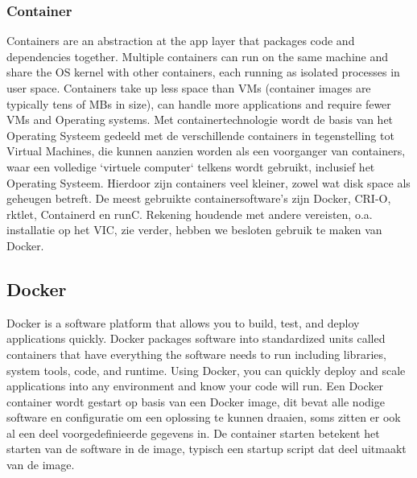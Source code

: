 \subsubsection{Container}
Containers are an abstraction at the app layer that packages code and dependencies together. Multiple containers can run on the same machine and share the OS kernel with other containers, each running as isolated processes in user space. Containers take up less space than VMs (container images are typically tens of MBs in size), can handle more applications and require fewer VMs and Operating systems.\autocite{Docker2023a}
\newline
\newline
Met containertechnologie wordt de basis van het Operating Systeem gedeeld met de verschillende containers in tegenstelling tot Virtual Machines, die kunnen aanzien worden als een voorganger van containers, waar een volledige `virtuele computer` telkens wordt gebruikt, inclusief het Operating Systeem. Hierdoor zijn containers veel kleiner, zowel wat disk space als geheugen betreft.
\newline
\newline
De meest gebruikte containersoftware's zijn Docker, CRI-O, rktlet, Containerd en runC. Rekening houdende met andere vereisten, o.a. installatie op het VIC, zie verder, hebben we besloten gebruik te maken van Docker.

\subsection{Docker}
Docker is a software platform that allows you to build, test, and deploy applications quickly. Docker packages software into standardized units called containers that have everything the software needs to run including libraries, system tools, code, and runtime. Using Docker, you can quickly deploy and scale applications into any environment and know your code will run. \autocite{AwsAmazon2023}
\newline
\newline
Een Docker container wordt gestart op basis van een Docker image, dit bevat alle nodige software en configuratie om een oplossing te kunnen draaien, soms zitten er ook al een deel voorgedefinieerde gegevens in. De container starten betekent het starten van de software in de image, typisch een startup script dat deel uitmaakt van de image.

